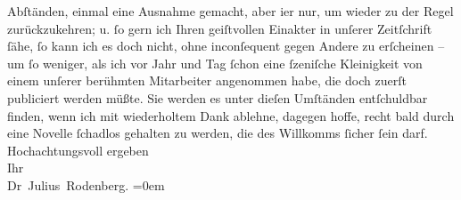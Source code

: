 \begin{ledgroupsized}[t]{13cm}
               Abſtänden, einmal eine Ausnahme gemacht, aber i{\geminationm}er nur,
               um wieder zu der Regel zurückzukehren; u. ſo gern ich Ihren geiſtvollen Einakter in unſerer Zeitſchrift
               ſähe, ſo kann ich es doch nicht, ohne inconſequent gegen Andere zu erſcheinen – um ſo
               weniger, als ich vor Jahr und Tag ſchon eine ſzeniſche Kleinigkeit von einem unſerer
               berühmten Mitarbeiter angenommen habe, die doch zuerſt publiciert werden müßte. Sie
               werden es unter dieſen Umſtänden entſchuldbar finden, wenn ich mit wiederholtem Dank
               ablehne, dagegen hoffe, recht bald durch eine Novelle ſchadlos gehalten zu werden,
               die des Willkomms ſicher ſein darf.\pend
           \pstart
           Hochachtungsvoll ergeben{\\[\baselineskip]}Ihr{\\[\baselineskip]}\spacefill\mbox{Dr Julius Rodenberg.}\pend
           \leftskip=0em{}
         
         \endnumbering{}\end{ledgroupsized}  \newcommand{\dateiname}{L00904}\newcommand{\titel}{Julius Rodenberg an Arthur Schnitzler, 9. 3. 1899}\newcommand{\editorInnen}{Martin Anton Müller und Gerd-Hermann Susen}
      